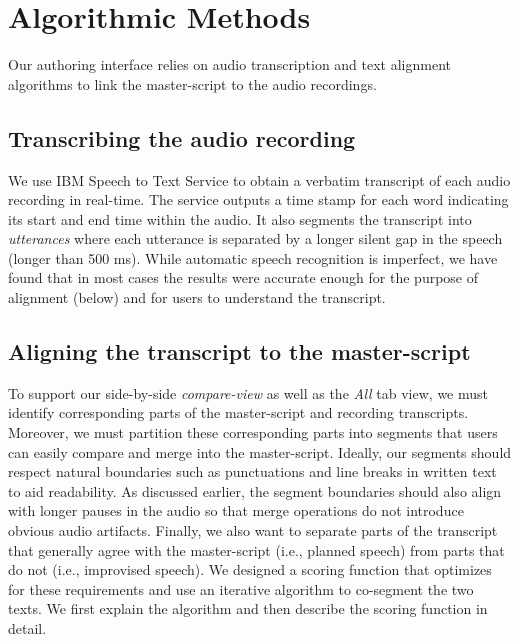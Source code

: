 \section{Algorithmic Methods}
\label{sec:algorithms}
Our authoring interface relies on audio transcription and text alignment algorithms to link the master-script to the audio recordings.  

\subsection{Transcribing the audio recording}
We use IBM Speech to Text Service \cite{ibmspeechtotext} to obtain a verbatim transcript of each audio recording in real-time. The service outputs a time stamp for each word indicating its start and end time within the audio. It also segments the transcript into \textit{utterances} where each utterance is separated by a longer silent gap in the speech (longer than 500 ms). While automatic speech recognition is imperfect, we have found that in most cases the results were accurate enough for the purpose of alignment (below) and for users to understand the transcript. 
  
\subsection{Aligning the transcript to the master-script}
To support our side-by-side \textit{compare-view} as well as the \textit{All} tab view, we must identify corresponding parts of the master-script and recording transcripts. Moreover, we must partition these corresponding parts into segments that users can easily compare and merge into the master-script. Ideally, our segments should respect natural boundaries such as punctuations and line breaks in written text to aid readability. As discussed earlier, the segment boundaries should also align with longer pauses in the audio so that merge operations do not introduce obvious audio artifacts. Finally, we also want to separate parts of the transcript that generally agree with the master-script (i.e., planned speech) from parts that do not (i.e., improvised speech).  We designed a scoring function that optimizes for these requirements and use an iterative algorithm to co-segment the two texts. We first explain the algorithm and then describe the scoring function in detail.

